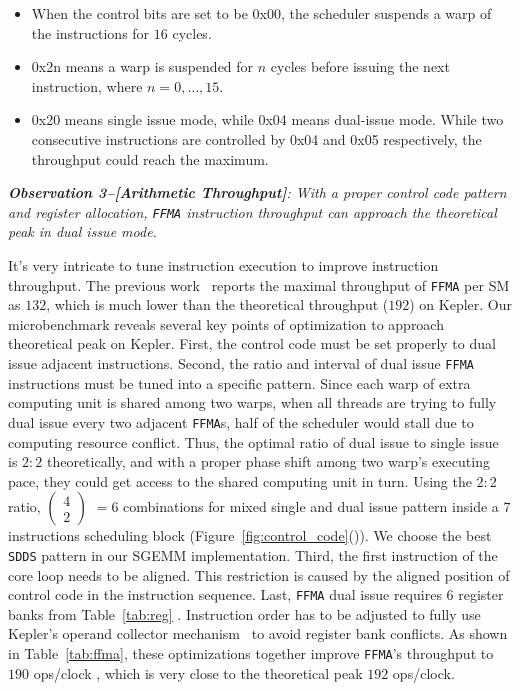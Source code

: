 \begin{itemize}
\item When the control bits are set to be 0x00, the scheduler suspends a warp of the instructions for $16$ cycles.
\item 0x2n means a warp is suspended for $n$ cycles before issuing the next instruction, where $n=0, \dots, 15$.
\item 0x20 means single issue mode, while 0x04 means dual-issue mode.
While two consecutive instructions are controlled by 0x04 and 0x05 respectively, the throughput could reach the maximum. 
\end{itemize}

{\em {\bf Observation 3--[Arithmetic Throughput]}:
With a proper control code pattern and register allocation, {\tt FFMA}
instruction throughput can approach the theoretical peak in dual issue mode.}

It's very intricate to tune instruction execution to improve instruction throughput. The previous work~\cite{lai}
reports the maximal throughput of {\tt FFMA} per SM as $132$, which is much lower than the theoretical throughput ($192$) on Kepler.
Our microbenchmark reveals several key points of optimization to approach theoretical peak on Kepler.
First, the control code must be set properly to dual issue adjacent instructions. Second, the ratio and interval of
dual issue {\tt FFMA} instructions must be tuned into a specific pattern.
Since each warp of extra computing unit is
shared among two warps,  when all threads are trying to fully dual issue every two adjacent {\tt FFMA}s, half of the
scheduler would stall due to computing resource conflict.
Thus, the optimal ratio of dual issue to single issue is $2:2$ theoretically, and
with a proper phase shift among two warp's executing pace, they could get access to the shared computing unit in turn. 
Using the $2:2$ ratio, \( \begin{pmatrix} 4 \\ 2 \end{pmatrix} \) $=6$ combinations for mixed single  and dual issue pattern inside a $7$ instructions scheduling block (Figure~\ref{fig:control_code}()).
We choose the best {\tt SDDS} pattern in our SGEMM implementation.
Third, the first instruction of the core loop needs to be aligned. This restriction is
caused by the aligned position of control code in the instruction sequence.
Last, {\tt FFMA} dual issue requires $6$ register banks from Table~\ref{tab:reg} .
Instruction order has to be adjusted to fully use Kepler's operand
collector mechanism~\cite{collector,tarjan2012policy} to avoid register bank conflicts.
As shown in
Table~\ref{tab:ffma}, these optimizations together improve {\tt FFMA}'s throughput to $190$ ops/clock , which is very close to the theoretical peak $192$ ops/clock.


